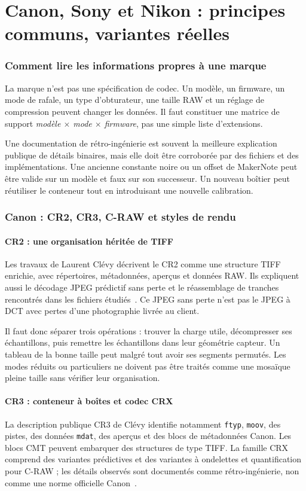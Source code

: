 \part{Canon, Sony et Nikon : principes communs, variantes réelles}
\section{Comment lire les informations propres à une marque}
La marque n'est pas une spécification de codec. Un modèle,
un firmware, un mode de rafale, un type d'obturateur, une
taille RAW et un réglage de compression peuvent changer
les données. Il faut constituer une matrice de support
\emph{modèle $\times$ mode $\times$ firmware}, pas une
simple liste d'extensions.

Une documentation de rétro-ingénierie est souvent la
meilleure explication publique de détails binaires,
mais elle doit être corroborée par des fichiers et des
implémentations. Une ancienne constante noire ou un
offset de MakerNote peut être valide sur un modèle et
faux sur son successeur. Un nouveau boîtier peut réutiliser
le conteneur tout en introduisant une nouvelle calibration.

\section{Canon : CR2, CR3, C-RAW et styles de rendu}
\subsection{CR2 : une organisation héritée de TIFF}
Les travaux de Laurent Clévy décrivent le CR2 comme une
structure TIFF enrichie, avec répertoires, métadonnées,
aperçus et données RAW. Ils expliquent aussi le décodage
JPEG prédictif sans perte et le réassemblage de tranches
rencontrés dans les fichiers étudiés~\cite{clevycr2}.
Ce JPEG sans perte n'est pas le JPEG à DCT avec pertes
d'une photographie livrée au client.

Il faut donc séparer trois opérations : trouver la charge
utile, décompresser ses échantillons, puis remettre les
échantillons dans leur géométrie capteur. Un tableau de
la bonne taille peut malgré tout avoir ses segments
permutés. Les modes réduits ou particuliers ne doivent
pas être traités comme une mosaïque pleine taille sans
vérifier leur organisation.

\subsection{CR3 : conteneur à boîtes et codec CRX}
La description publique CR3 de Clévy identifie notamment
\texttt{ftyp}, \texttt{moov}, des pistes, des données
\texttt{mdat}, des aperçus et des blocs de métadonnées
Canon. Les blocs CMT peuvent embarquer des structures
de type TIFF. La famille CRX comprend des variantes
prédictives et des variantes à ondelettes et quantification
pour C-RAW ; les détails observés sont documentés comme
rétro-ingénierie, non comme une norme officielle Canon~\cite{clevycr3}.

